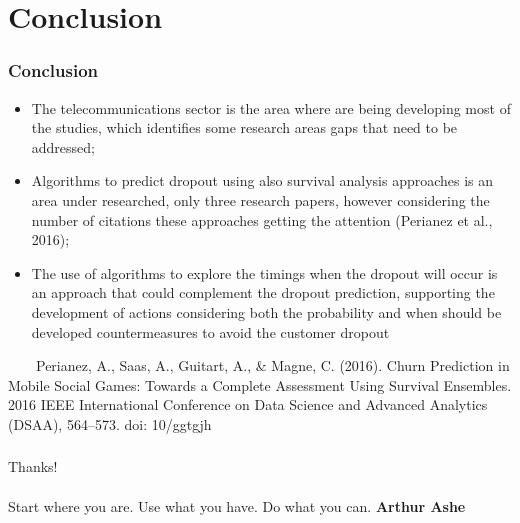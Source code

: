 \documentclass[10pt]{beamer}
\begin{document}
\section{Conclusion}
\begin{frame}
	\frametitle{Conclusion}
	\begin{itemize}

 		\item The telecommunications sector is the area where are being developing most of the studies, which identifies some research areas gaps that need to be addressed;
 		\item Algorithms to predict dropout using also survival analysis approaches is an area under researched, only three research papers, however  considering the number of citations these approaches getting the attention (Perianez et al., 2016);
 		\item The use of algorithms to explore the timings when the dropout will occur is an approach that could complement the dropout prediction, supporting the development of actions considering both the probability and when should be developed countermeasures to avoid the customer dropout
	\end{itemize}
	\tiny 
	~~~~Perianez, A., Saas, A., Guitart, A., \& Magne, C. (2016). Churn Prediction in Mobile Social Games: Towards a Complete Assessment Using Survival Ensembles. 2016 IEEE International Conference on Data Science and Advanced Analytics (DSAA), 564–573. doi: 10/ggtgjh

\end{frame}


\begin{frame}
\frametitle{}
\normalsize
	\Huge Thanks! \\~\\
	\Large Start where you are. Use what you have. Do what you can. \textbf{Arthur Ashe}
\end{frame}
\end{document}
